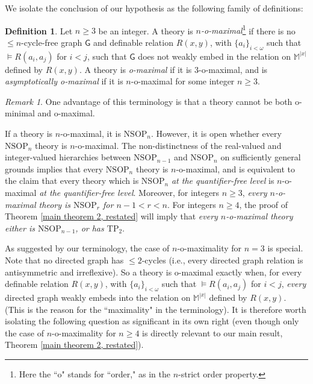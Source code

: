 \documentclass{amsart}
\theoremstyle{definition}
\newtheorem{definition}[theorem]{Definition}
\theoremstyle{remark}
\newtheorem{remark}[theorem]{Remark}
\numberwithin{equation}{section}
\begin{document}
We isolate the conclusion of our hypothesis as the following family of definitions:

\begin{definition}\label{o-maximality}
    Let $n\geq 3$ be an integer. A theory is \textit{$n$-o-maximal}\footnote{Here the ``o" stands for ``order," as in the $n$-strict order property.} if there is no $\leq n$-cycle-free graph $\mathsf{G}$ and definable relation $R(x, y)$, with $\{a_{i}\}_{i < \omega}$ such that $\models R(a_i, a_j)$ for $i < j$, such that $\mathsf{G}$ does not weakly embed in the relation on $\mathbb{M}^{|x|}$ defined by $R(x, y)$. A theory is \textit{o-maximal} if it is $3$-o-maximal, and is \textit{asymptotically o-maximal} if it is $n$-o-maximal for some integer $n \geq 3$.
\end{definition}

\begin{remark}
    One advantage of this terminology is that a theory cannot be both o-minimal and o-maximal.
\end{remark}

If a theory is $n$-o-maximal, it is $\mathrm{NSOP}_{n}$. However, it is open whether every $\mathrm{NSOP}_{n}$ theory is $n$-o-maximal. The non-distinctness of the real-valued and integer-valued hierarchies between $\mathrm{NSOP}_{n-1}$ and $\mathrm{NSOP}_{n}$ on sufficiently general grounds implies that every $\mathrm{NSOP}_{n}$ theory is $n$-o-maximal, and is equivalent to the claim that every theory which is $\mathrm{NSOP}_{n}$  \textit{at the quantifier-free level} is $n$-o-maximal \textit{at the quantifier-free level}. Moreover, for integers $n \geq 3$, \textit{every $n$-o-maximal theory is $\mathrm{NSOP}_{r}$ for $n -1 < r < n$}. For integers $n \geq 4$, the proof of Theorem \ref{main theorem 2, restated} will imply that \textit{every $n$-o-maximal theory either is $\mathrm{NSOP}_{n-1}$, or has $\mathrm{TP}_{2}$}. 

As suggested by our terminology, the case of $n$-o-maximality for $n=3$ is special. Note that no directed graph has $\leq 2$-cycles (i.e., every directed graph relation is antisymmetric and irreflexive). So a theory is o-maximal exactly when, for every definable relation $R(x, y)$, with $\{a_{i}\}_{i < \omega}$ such that $\models R(a_i, a_j)$ for $i < j$, \textit{every} directed graph weakly embeds into the relation on $\mathbb{M}^{|x|}$ defined by $R(x, y)$. (This is the reason for the ``maximality" in the terminology). It is therefore worth isolating the following question as significant in its own right (even though only the case of $n$-o-maximality for $n \geq 4$ is directly relevant to our main result, Theorem \ref{main theorem 2, restated}).
\end{document}
